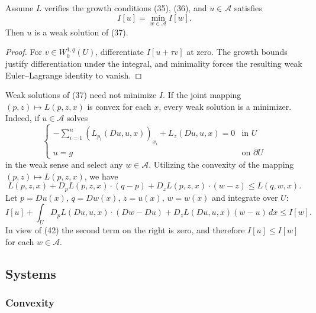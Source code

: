 \begin{theorem}
\label{thm:weak-solution-euler-lagrange-scalar}

Assume $L$ verifies the growth conditions (35), (36), and $u \in \mathcal{A}$ satisfies
\[
I[u] = \min_{w \in \mathcal{A}} I[w].
\]
Then $u$ is a weak solution of (37).
\end{theorem}

\begin{proof}
\sketch For $v\in W_0^{1,q}(U)$, differentiate $I[u+\tau v]$ at zero. The growth bounds justify differentiation under the integral, and minimality forces the resulting weak Euler--Lagrange identity to vanish.
\end{proof}

\begin{remark}
\label{rem:weak-solution-minimizer-joint-convexity}

Weak solutions of (37) need not minimize $I$. If the joint mapping $(p,z)\mapsto L(p,z,x)$ is convex for each $x$, every weak solution is a minimizer. Indeed, if $u\in\mathcal A$ solves
\[
\begin{cases}
-\sum_{i=1}^n (L_{p_i}(Du, u, x))_{x_i} + L_z(Du, u, x) = 0 & \text{in } U \\
u = g & \text{on } \partial U
\end{cases}
\tag{42}
\]
in the weak sense and select any $w \in \mathcal{A}$. Utilizing the convexity of the mapping $(p, z) \mapsto L(p, z, x)$, we have
\[
L(p, z, x) + D_p L(p, z, x) \cdot (q - p) + D_z L(p, z, x) \cdot (w - z) \leq L(q, w, x).
\]
Let $p = Du(x)$, $q = Dw(x)$, $z = u(x)$, $w = w(x)$ and integrate over $U$:
\[
I[u] + \int_U D_p L(Du, u, x) \cdot (Dw - Du) + D_z L(Du, u, x)(w - u) \, dx \leq I[w].
\]
In view of (42) the second term on the right is zero, and therefore $I[u] \leq I[w]$ for each $w \in \mathcal{A}$.
\end{remark}

\subsection{Systems}
\label{sec:systems-existence-minimizers}

\subsubsection{Convexity}

